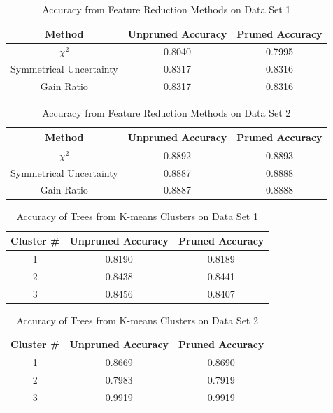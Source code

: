 \documentclass[conference,compsoc]{IEEEtran}
\begin{document}
\begin{table}[!t]
\renewcommand{\arraystretch}{1.3}
\caption{Accuracy from Feature Reduction Methods on Data Set 1}
\label{table.feature.reduction.accuracy.01}
\centering
\begin{tabular}{ccc}
\hline
Method & Unpruned Accuracy & Pruned Accuracy \\
\hline 
${\chi}^2$ & 0.8040 & 0.7995 \\
Symmetrical Uncertainty & 0.8317 & 0.8316 \\
Gain Ratio & 0.8317 & 0.8316 \\
\hline
\end{tabular}
\end{table}

\begin{table}[!t]
\renewcommand{\arraystretch}{1.3}
\caption{Accuracy from Feature Reduction Methods on Data Set 2}
\label{table.feature.reduction.accuracy.02}
\centering
\begin{tabular}{ccc}
\hline
Method & Unpruned Accuracy & Pruned Accuracy \\
\hline 
${\chi}^2$ & 0.8892 & 0.8893 \\
Symmetrical Uncertainty & 0.8887 & 0.8888 \\
Gain Ratio & 0.8887 & 0.8888 \\
\hline
\end{tabular}
\end{table}

\begin{table}[!t]
\renewcommand{\arraystretch}{1.3}
\caption{Accuracy of Trees from K-means Clusters on Data Set 1}
\label{table.kmeans.accuracy.01}
\centering
\begin{tabular}{ccc}
\hline
Cluster \# & Unpruned Accuracy & Pruned Accuracy \\
\hline 
1 & 0.8190 & 0.8189 \\
2 & 0.8438 & 0.8441 \\
3 & 0.8456 & 0.8407 \\
\hline
\end{tabular}
\end{table}

\begin{table}[!t]
\renewcommand{\arraystretch}{1.3}
\caption{Accuracy of Trees from K-means Clusters on Data Set 2}
\label{table.kmeans.accuracy.02}
\centering
\begin{tabular}{ccc}
\hline
Cluster \# & Unpruned Accuracy & Pruned Accuracy \\
\hline 
1 & 0.8669 & 0.8690 \\
2 & 0.7983 & 0.7919 \\
3 & 0.9919 & 0.9919 \\
\hline
\end{tabular}
\end{table}
\end{document}
